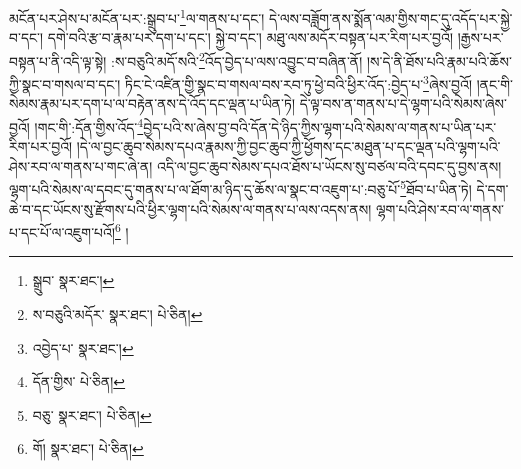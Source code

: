 མངོན་པར་ཤེས་པ་མངོན་པར་:སྒྲུབ་པ་\footnote{སྒྲུབ་  སྣར་ཐང་། }ལ་གནས་པ་དང་། དེ་ལས་བཟློག་ནས་སྨོན་ལམ་གྱིས་གང་དུ་འདོད་པར་སྐྱེ་བ་དང་། དགེ་བའི་རྩ་བ་རྣམ་པར་དག་པ་དང་། སྐྱེ་བ་དང་། མཐུ་ལས་མདོར་བསྟན་པར་རིག་པར་བྱའོ། །རྒྱས་པར་བསྟན་པ་ནི་འདི་ལྟ་སྟེ། :ས་བཅུའི་མདོ་སའི་\footnote{ས་བཅུའི་མདོར་  སྣར་ཐང་།  པེ་ཅིན། }འོད་བྱེད་པ་ལས་འབྱུང་བ་བཞིན་ནོ། །ས་དེ་ནི་ཐོས་པའི་རྣམ་པའི་ཆོས་ཀྱི་སྣང་བ་གསལ་བ་དང་། ཏིང་ངེ་འཛིན་གྱི་སྣང་བ་གསལ་བས་རབ་ཏུ་ཕྱེ་བའི་ཕྱིར་འོད་:བྱེད་པ་\footnote{འབྱེད་པ་  སྣར་ཐང་། }ཞེས་བྱའོ། །ནང་གི་སེམས་རྣམ་པར་དག་པ་ལ་བརྟེན་ནས་དེ་འོད་དང་ལྡན་པ་ཡིན་ཏེ། དེ་ལྟ་བས་ན་གནས་པ་དེ་ལྷག་པའི་སེམས་ཞེས་བྱའོ། །གང་གི་:དོན་གྱིས་འོད་\footnote{དོན་གྱིས་  པེ་ཅིན། }བྱེད་པའི་ས་ཞེས་བྱ་བའི་དོན་དེ་ཉིད་ཀྱིས་ལྷག་པའི་སེམས་ལ་གནས་པ་ཡིན་པར་རིག་པར་བྱའོ། །དེ་ལ་བྱང་ཆུབ་སེམས་དཔའ་རྣམས་ཀྱི་བྱང་ཆུབ་ཀྱི་ཕྱོགས་དང་མཐུན་པ་དང་ལྡན་པའི་ལྷག་པའི་ཤེས་རབ་ལ་གནས་པ་གང་ཞེ་ན། འདི་ལ་བྱང་ཆུབ་སེམས་དཔའ་ཐོས་པ་ཡོངས་སུ་བཙལ་བའི་དབང་དུ་བྱས་ནས། ལྷག་པའི་སེམས་ལ་དབང་དུ་གནས་པ་ལ་ཐོག་མ་ཉིད་དུ་ཆོས་ལ་སྣང་བ་འཇུག་པ་:བཅུ་པོ་\footnote{བཅུ་  སྣར་ཐང་།  པེ་ཅིན། }ཐོབ་པ་ཡིན་ཏེ། དེ་དག་ཆེ་བ་དང་ཡོངས་སུ་རྫོགས་པའི་ཕྱིར་ལྷག་པའི་སེམས་ལ་གནས་པ་ལས་འདས་ནས། ལྷག་པའི་ཤེས་རབ་ལ་གནས་པ་དང་པོ་ལ་འཇུག་པའོ།\footnote{གོ།  སྣར་ཐང་།  པེ་ཅིན། } །
